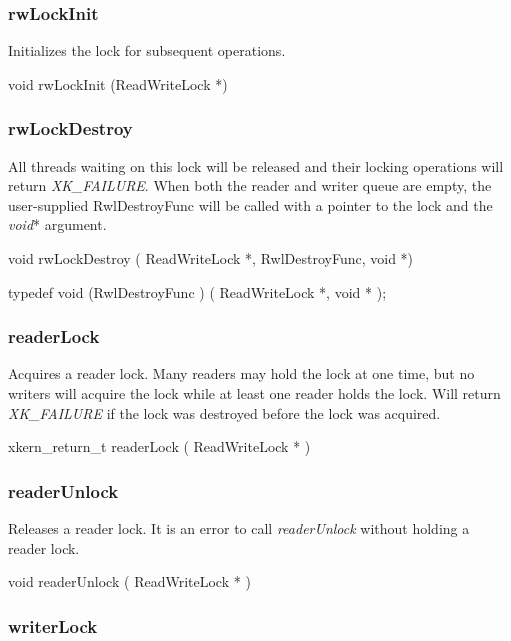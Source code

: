 \subsubsection{rwLockInit}

Initializes the lock for subsequent operations.  

\medskip
{\sem void} {\bold rwLockInit} ({\sem ReadWriteLock} *)


\subsubsection{rwLockDestroy}

All threads waiting on this lock will be released and their locking
operations will return {\em XK\_FAILURE}.  When both the reader and writer
queue are empty, the user-supplied {RwlDestroyFunc} will be called
with a pointer to the lock and the {\em void}* argument.

\medskip

{\sem void} {\bold rwLockDestroy} 
( {\sem ReadWriteLock} *, {\sem RwlDestroyFunc}, {\sem void} *)

\medskip
{\sem typedef void} ({\bold *RwlDestroyFunc} )
( {\sem ReadWriteLock} *, {\sem void} * );


\subsubsection{readerLock}

Acquires a reader lock.  Many readers may hold the lock at one time,
but no writers will acquire the lock while at least one reader holds
the lock.  Will return {\em XK\_FAILURE} if the lock was destroyed before
the lock was acquired.

\medskip
{\sem xkern\_return\_t} {\bold readerLock} ( {\sem ReadWriteLock} * )


\subsubsection{readerUnlock}

Releases a reader lock.  It is an error to call {\em readerUnlock}
without holding a reader lock.

\medskip
{\sem void} {\bold readerUnlock} ( {\sem ReadWriteLock} * )


\subsubsection{writerLock}

